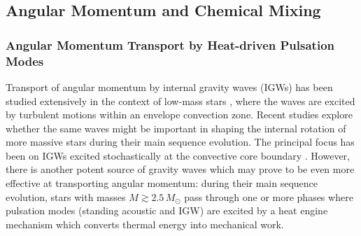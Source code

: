 
\subsection{Angular Momentum and Chemical Mixing}

\subsubsection{Angular Momentum Transport by Heat-driven Pulsation Modes}

Transport of angular momentum by internal gravity waves (IGWs) has been studied extensively in the context of low-mass stars  \citep[e.g.,][]{Schatzman:1993,Kumar:1997,Zahn:1997,Talon:2002,Talon:2005,Rogers:2008aa}, where the waves are excited by turbulent motions within an envelope convection zone. Recent studies explore whether the same waves might be important in shaping the internal rotation of more massive stars during their main sequence evolution. The principal focus has been on IGWs excited stochastically at the convective core boundary \citep[e.g.][]{Rogers:2013,Lee:2014,Rogers:2015}. However, there is another potent source of gravity waves which may prove to be even more effective at transporting angular momentum: during their main sequence evolution, stars with masses $M \gtrsim 2.5\,M_{\odot}$ pass through one or more phases where pulsation modes (standing acoustic and IGW) are excited by a heat engine mechanism which converts thermal energy into mechanical work.

